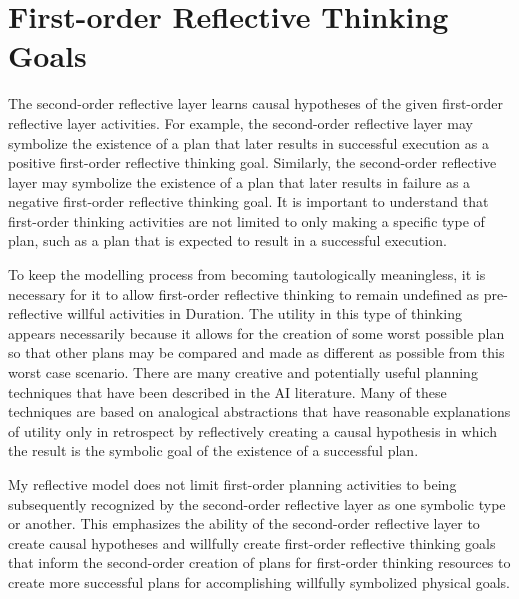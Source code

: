 \section{First-order Reflective Thinking Goals}

The second-order reflective layer learns causal hypotheses of the
given first-order reflective layer activities.  For example, the
second-order reflective layer may symbolize the existence of a plan
that later results in successful execution as a positive first-order
reflective thinking goal.  Similarly, the second-order reflective
layer may symbolize the existence of a plan that later results in
failure as a negative first-order reflective thinking goal.  It is
important to understand that first-order thinking activities are not
limited to only making a specific type of plan, such as a plan that is
expected to result in a successful execution.

To keep the modelling process from becoming tautologically
meaningless, it is necessary for it to allow first-order reflective
thinking to remain undefined as pre-reflective willful activities in
Duration.  The utility in this type of thinking appears necessarily
because it allows for the creation of some worst possible plan so that
other plans may be compared and made as different as possible from
this worst case scenario.  There are many creative and potentially
useful planning techniques that have been described in the AI
literature.  Many of these techniques are based on analogical
abstractions that have reasonable explanations of utility only in
retrospect by reflectively creating a causal hypothesis in which the
result is the symbolic goal of the existence of a successful plan.

My reflective model does not limit first-order planning activities to
being subsequently recognized by the second-order reflective layer as
one symbolic type or another.  This emphasizes the ability of the
second-order reflective layer to create causal hypotheses and
willfully create first-order reflective thinking goals that inform the
second-order creation of plans for first-order thinking resources to
create more successful plans for accomplishing willfully symbolized
physical goals.

